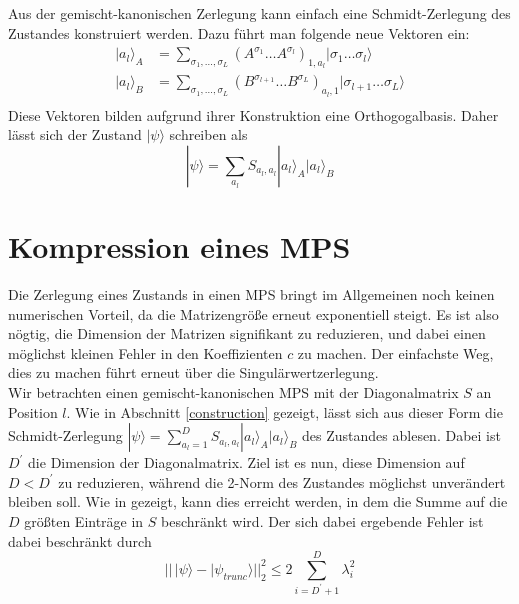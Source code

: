 \documentclass[10pt,a4paper]{report}
\newcommand{\SumIndex}{\sigma_1,\ldots,\sigma_L}
\begin{document}
Aus der gemischt-kanonischen Zerlegung kann einfach eine Schmidt-Zerlegung des Zustandes konstruiert werden. Dazu führt man folgende neue Vektoren ein:
\begin{equation}
\begin{split}
|a_l\rangle_A&=\sum_{\SumIndex}(A^{\sigma_1}\ldots A^{\sigma_l})_{1,a_l}|\sigma_1\ldots\sigma_l\rangle \\
|a_l\rangle_B&=\sum_{\SumIndex}(B^{\sigma_{l+1}}\ldots B^{\sigma_L})_{a_l,1}|\sigma_{l+1}\ldots\sigma_L\rangle\\
\end{split}
\end{equation}
Diese Vektoren bilden aufgrund ihrer Konstruktion eine Orthogogalbasis. Daher lässt sich der Zustand $|\psi\rangle$ schreiben als
\begin{equation}
|\psi\rangle=\sum_{a_l}S_{a_l,a_l}|a_l\rangle_A|a_l\rangle_B
\end{equation}

\section{Kompression eines MPS}\label{compress}
Die Zerlegung eines Zustands in einen MPS bringt im Allgemeinen noch keinen numerischen Vorteil, da die Matrizengröße erneut exponentiell steigt. Es ist also nögtig, die Dimension der Matrizen signifikant zu reduzieren, und dabei einen möglichst kleinen Fehler in den Koeffizienten $c$ zu machen. Der einfachste Weg, dies zu machen führt erneut über die Singulärwertzerlegung.\\


Wir betrachten einen gemischt-kanonischen MPS mit der Diagonalmatrix $S$ an Position $l$. Wie in Abschnitt \ref{construction} gezeigt, lässt sich aus dieser Form die Schmidt-Zerlegung $|\psi\rangle=\sum_{a_l=1}^D S_{a_l,a_l}|a_l\rangle_A|a_l\rangle_B$ des Zustandes ablesen. Dabei ist $D^\prime$ die Dimension der Diagonalmatrix. Ziel ist es nun, diese Dimension auf $D<D^\prime$ zu reduzieren, während die 2-Norm des Zustandes möglichst unverändert bleiben soll. Wie in  gezeigt, kann dies erreicht werden, in dem die Summe auf die $D$ größten Einträge in $S$ beschränkt wird. Der sich dabei ergebende Fehler ist dabei beschränkt durch 
\begin{equation}
||\,|\psi\rangle-|\psi_{trunc}\rangle||_2^2\leq 2\sum_{i=D^\prime+1}^D \lambda_i^2
\end{equation}
\end{document}

